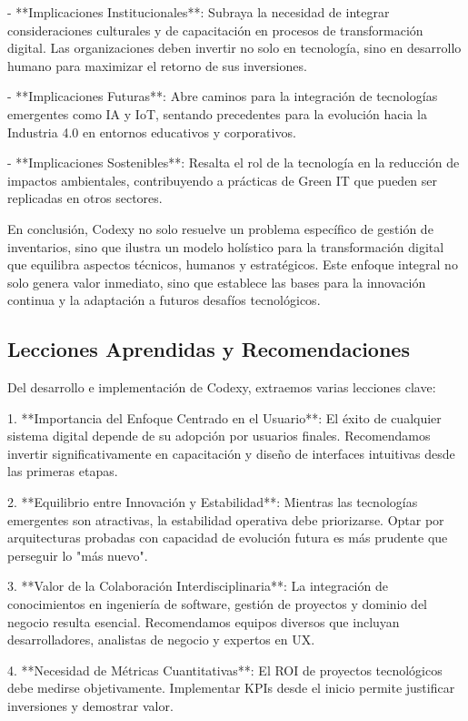 - **Implicaciones Institucionales**: Subraya la necesidad de integrar consideraciones culturales y de capacitación en procesos de transformación digital. Las organizaciones deben invertir no solo en tecnología, sino en desarrollo humano para maximizar el retorno de sus inversiones.

- **Implicaciones Futuras**: Abre caminos para la integración de tecnologías emergentes como IA y IoT, sentando precedentes para la evolución hacia la Industria 4.0 en entornos educativos y corporativos.

- **Implicaciones Sostenibles**: Resalta el rol de la tecnología en la reducción de impactos ambientales, contribuyendo a prácticas de Green IT que pueden ser replicadas en otros sectores.

En conclusión, Codexy no solo resuelve un problema específico de gestión de inventarios, sino que ilustra un modelo holístico para la transformación digital que equilibra aspectos técnicos, humanos y estratégicos. Este enfoque integral no solo genera valor inmediato, sino que establece las bases para la innovación continua y la adaptación a futuros desafíos tecnológicos.

\subsection{Lecciones Aprendidas y Recomendaciones}

Del desarrollo e implementación de Codexy, extraemos varias lecciones clave:

1. **Importancia del Enfoque Centrado en el Usuario**: El éxito de cualquier sistema digital depende de su adopción por usuarios finales. Recomendamos invertir significativamente en capacitación y diseño de interfaces intuitivas desde las primeras etapas.

2. **Equilibrio entre Innovación y Estabilidad**: Mientras las tecnologías emergentes son atractivas, la estabilidad operativa debe priorizarse. Optar por arquitecturas probadas con capacidad de evolución futura es más prudente que perseguir lo "más nuevo".

3. **Valor de la Colaboración Interdisciplinaria**: La integración de conocimientos en ingeniería de software, gestión de proyectos y dominio del negocio resulta esencial. Recomendamos equipos diversos que incluyan desarrolladores, analistas de negocio y expertos en UX.

4. **Necesidad de Métricas Cuantitativas**: El ROI de proyectos tecnológicos debe medirse objetivamente. Implementar KPIs desde el inicio permite justificar inversiones y demostrar valor.

